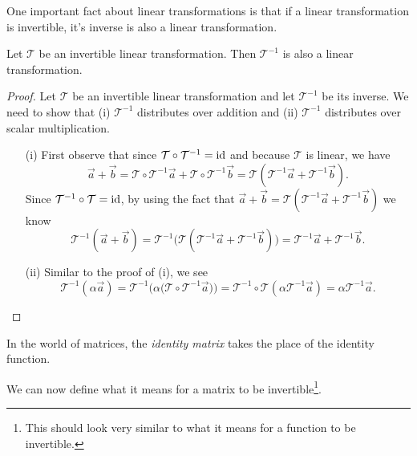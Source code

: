 One important fact about linear transformations is that if a linear transformation is invertible,
it's inverse is also a linear transformation.
\begin{theorem}
	Let $\mathcal T$ be an invertible linear transformation. Then $\mathcal T^{-1}$ is also
	a linear transformation.
\end{theorem}
\begin{proof}
	Let $\mathcal T$ be an invertible linear transformation and let $\mathcal T^{-1}$ be its inverse.
	We need to show that (i) $\mathcal T^{-1}$ distributes over addition and (ii) $\mathcal T^{-1}$
	distributes over scalar multiplication.
	\begin{enumerate}
		\item[(i)] First observe that since $\mathcal T\circ \mathcal T^{-1}=\operatorname{\operatorname{id}}$ and because $\mathcal T$ is linear, we have
		\[
			\vec a+\vec b = \mathcal T\circ \mathcal T^{-1}\vec a+\mathcal T\circ \mathcal T^{-1}\vec b=
			\mathcal T(\mathcal T^{-1}\vec a+ \mathcal T^{-1}\vec b).
		\]
		Since $\mathcal T^{-1}\circ \mathcal T=\operatorname{\operatorname{id}}$, by using the fact that
			$\vec a+\vec b=\mathcal T(\mathcal T^{-1}\vec a+ \mathcal T^{-1}\vec b)$ we know
		\[
			\mathcal T^{-1}(\vec a+\vec b) = 
			\mathcal T^{-1}\Big(\mathcal T(\mathcal T^{-1}\vec a+ \mathcal T^{-1}\vec b)\Big)=
			\mathcal T^{-1}\vec a+ \mathcal T^{-1}\vec b.
		\]
		\item[(ii)] Similar to the proof of (i), we see
		\[
			\mathcal T^{-1}(\alpha\vec a) = \mathcal T^{-1}\Big(\alpha \big(\mathcal T\circ \mathcal T^{-1}\vec a\big)\Big)
			=\mathcal T^{-1}\circ \mathcal T(\alpha \mathcal T^{-1}\vec a) = \alpha\mathcal T^{-1}\vec a.
		\]
	\end{enumerate}
\end{proof}


In the world of matrices, the \emph{identity matrix} takes the place of the identity function.


We can now define what it means for a matrix to be invertible\footnote{ This should look very similar to what it means
for a function to be invertible.}.


